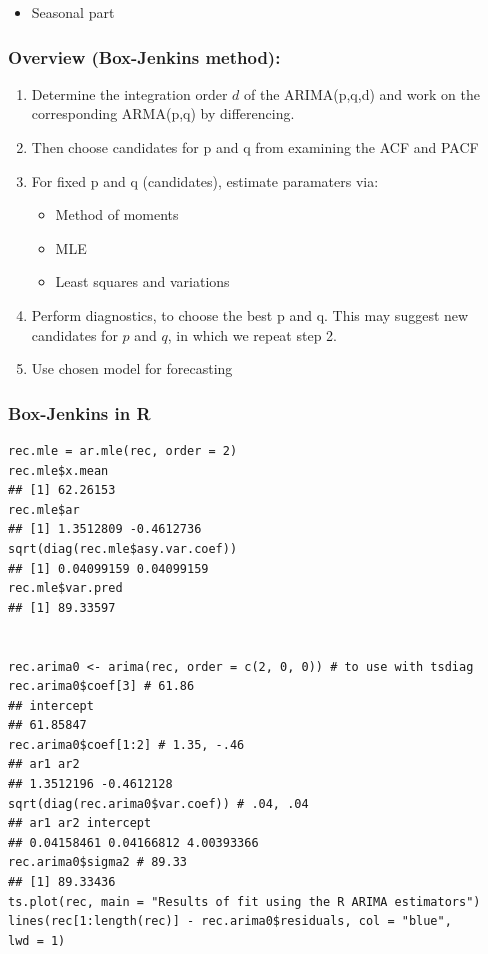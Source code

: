 \documentclass{article}
\begin{document}
\begin{itemize}
    \item Seasonal part
\end{itemize}

\subsubsection{Overview (Box-Jenkins method):}
\begin{enumerate}
    \item Determine the integration order $d$ of the ARIMA(p,q,d) and work on the corresponding ARMA(p,q) by differencing.
    \item Then choose candidates for p and q from examining the ACF and PACF
    \item For fixed p and q (candidates), estimate paramaters via:
    \begin{itemize}
        \item Method of moments
        \item MLE
        \item Least squares and variations
    \end{itemize}
    \item Perform diagnostics, to choose the best p and q. This may suggest new candidates for $p$ and $q$, in which we repeat step 2.
    \item Use chosen model for forecasting
\end{enumerate}

\subsubsection{Box-Jenkins in R}

\begin{lstlisting}
rec.mle = ar.mle(rec, order = 2)
rec.mle$x.mean
## [1] 62.26153
rec.mle$ar
## [1] 1.3512809 -0.4612736
sqrt(diag(rec.mle$asy.var.coef))
## [1] 0.04099159 0.04099159
rec.mle$var.pred
## [1] 89.33597


rec.arima0 <- arima(rec, order = c(2, 0, 0)) # to use with tsdiag
rec.arima0$coef[3] # 61.86
## intercept
## 61.85847
rec.arima0$coef[1:2] # 1.35, -.46
## ar1 ar2
## 1.3512196 -0.4612128
sqrt(diag(rec.arima0$var.coef)) # .04, .04
## ar1 ar2 intercept
## 0.04158461 0.04166812 4.00393366
rec.arima0$sigma2 # 89.33
## [1] 89.33436
ts.plot(rec, main = "Results of fit using the R ARIMA estimators")
lines(rec[1:length(rec)] - rec.arima0$residuals, col = "blue",
lwd = 1)

\end{lstlisting}
\end{document}
